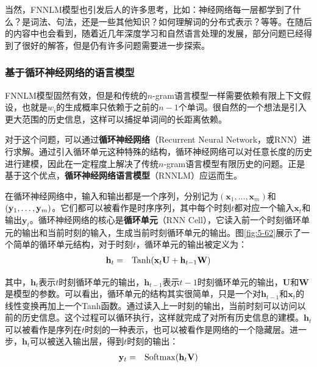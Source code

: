\parinterval  当然，FNNLM模型也引发后人的许多思考，比如：神经网络每一层都学到了什么？是词法、句法，还是一些其他知识？如何理解词的分布式表示？等等。在随后的内容中也会看到，随着近几年深度学习和自然语言处理的发展，部分问题已经得到了很好的解答，但是仍有许多问题需要进一步探索。


\subsubsection{基于循环神经网络的语言模型}

\parinterval  FNNLM模型固然有效，但是和传统的$n$-gram语言模型一样需要依赖有限上下文假设，也就是$ w_i $的生成概率只依赖于之前的$ n-1 $个单词。很自然的一个想法是引入更大范围的历史信息，这样可以捕捉单词间的长距离依赖。

\parinterval  对于这个问题，可以通过{\small\sffamily\bfseries{循环神经网络}}（Recurrent Neural Network，或RNN）进行求解。通过引入循环单元这种特殊的结构，循环神经网络可以对任意长度的历史进行建模，因此在一定程度上解决了传统$n$-gram语言模型有限历史的问题。正是基于这个优点，{\small\sffamily\bfseries{循环神经网络语言模型}}（RNNLM）应运而生\cite{mikolov2010recurrent}。

\parinterval  在循环神经网络中，输入和输出都是一个序列，分别记为$ (\mathbf x_1,\dots,\mathbf x_m) $和$ (\mathbf y_1,\dots,\\ \mathbf y_m) $。它们都可以被看作是时序序列，其中每个时刻$ t $都对应一个输入$ \mathbf x_t $和输出$ \mathbf y_t $。循环神经网络的核心是{\small\sffamily\bfseries{循环单元}}（RNN Cell），它读入前一个时刻循环单元的输出和当前时刻的输入，生成当前时刻循环单元的输出。图\ref{fig:5-62}展示了一个简单的循环单元结构，对于时刻$ t $，循环单元的输出被定义为：
\begin{eqnarray}
\mathbf h_t&=&{\rm{Tanh}}(\mathbf x_t\mathbf U+\mathbf h_{t-1}\mathbf W)
\label{eq:5-63}
\end{eqnarray}

\noindent  其中，$ \mathbf h_t $表示$ t $时刻循环单元的输出，$ \mathbf h_{t-1} $表示$ t-1 $时刻循环单元的输出，$ \mathbf U $和$ \mathbf W $是模型的参数。可以看出，循环单元的结构其实很简单，只是一个对$ \mathbf h_{t-1} $和$ \mathbf x_t $的线性变换再加上一个Tanh函数。通过读入上一时刻的输出，当前时刻可以访问以前的历史信息。这个过程可以循环执行，这样就完成了对所有历史信息的建模。$ \mathbf h_t $可以被看作是序列在$ t $时刻的一种表示，也可以被看作是网络的一个隐藏层。进一步，$ \mathbf h_t $可以被送入输出层，得到$ t $时刻的输出：
\begin{eqnarray}
\mathbf y_t&=&{\rm{Softmax}}(\mathbf h_t\mathbf V)
\label{eq:5-64}
\end{eqnarray}

